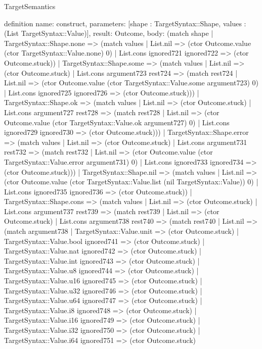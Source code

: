 \begin{lexlean}{TargetSemantics}
\begin{semanticmodule}
definition{
  name: construct,
  parameters: [shape : TargetSyntax::Shape, values : (List TargetSyntax::Value)],
  result: Outcome,
  body: (match shape
    | TargetSyntax::Shape.none => (match values
      | List.nil => (ctor Outcome.value (ctor TargetSyntax::Value.none) 0)
      | List.cons ignored721 ignored722 => (ctor Outcome.stuck))
    | TargetSyntax::Shape.some => (match values
      | List.nil => (ctor Outcome.stuck)
      | List.cons argument723 rest724 => (match rest724
        | List.nil => (ctor Outcome.value (ctor TargetSyntax::Value.some argument723) 0)
        | List.cons ignored725 ignored726 => (ctor Outcome.stuck)))
    | TargetSyntax::Shape.ok => (match values
      | List.nil => (ctor Outcome.stuck)
      | List.cons argument727 rest728 => (match rest728
        | List.nil => (ctor Outcome.value (ctor TargetSyntax::Value.ok argument727) 0)
        | List.cons ignored729 ignored730 => (ctor Outcome.stuck)))
    | TargetSyntax::Shape.error => (match values
      | List.nil => (ctor Outcome.stuck)
      | List.cons argument731 rest732 => (match rest732
        | List.nil => (ctor Outcome.value (ctor TargetSyntax::Value.error argument731) 0)
        | List.cons ignored733 ignored734 => (ctor Outcome.stuck)))
    | TargetSyntax::Shape.nil => (match values
      | List.nil => (ctor Outcome.value (ctor TargetSyntax::Value.list (nil TargetSyntax::Value)) 0)
      | List.cons ignored735 ignored736 => (ctor Outcome.stuck))
    | TargetSyntax::Shape.cons => (match values
      | List.nil => (ctor Outcome.stuck)
      | List.cons argument737 rest739 => (match rest739
        | List.nil => (ctor Outcome.stuck)
        | List.cons argument738 rest740 => (match rest740
          | List.nil => (match argument738
            | TargetSyntax::Value.unit => (ctor Outcome.stuck)
            | TargetSyntax::Value.bool ignored741 => (ctor Outcome.stuck)
            | TargetSyntax::Value.nat ignored742 => (ctor Outcome.stuck)
            | TargetSyntax::Value.int ignored743 => (ctor Outcome.stuck)
            | TargetSyntax::Value.u8 ignored744 => (ctor Outcome.stuck)
            | TargetSyntax::Value.u16 ignored745 => (ctor Outcome.stuck)
            | TargetSyntax::Value.u32 ignored746 => (ctor Outcome.stuck)
            | TargetSyntax::Value.u64 ignored747 => (ctor Outcome.stuck)
            | TargetSyntax::Value.i8 ignored748 => (ctor Outcome.stuck)
            | TargetSyntax::Value.i16 ignored749 => (ctor Outcome.stuck)
            | TargetSyntax::Value.i32 ignored750 => (ctor Outcome.stuck)
            | TargetSyntax::Value.i64 ignored751 => (ctor Outcome.stuck)
}
\end{semanticmodule}
\end{lexlean}
